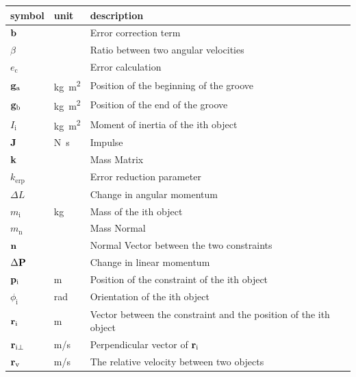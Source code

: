 \documentclass[12pt]{article}
\begin{document}
\noindent \begin{longtable}{l l p{12cm}} \toprule
  \textbf{symbol} & \textbf{unit} & \textbf{description}\\
  \midrule 
  $\bf b$ & \si[per-mode=symbol]    & Error correction term
  \\ 
  $\beta$ & \si[per-mode=symbol]    & Ratio between two angular velocities
  \\ 
  $e_\text{c}$ & \si[per-mode=symbol]   & Error calculation
  \\ 
$\bf{g_\text{a}}$ & \si[per-mode=symbol] {\kilo\gram\metre^{2}} & Position of
the beginning of the groove
  \\ 
$\bf{g_\text{b}}$ & \si[per-mode=symbol] {\kilo\gram\metre^{2}} & Position of
the end of the groove
  \\ 
$ I_\text{i}$ & \si[per-mode=symbol] {\kilo\gram\metre^{2}} & Moment of inertia
of the ith object
  \\ 
  $\bf{J}$ & \si[per-mode=symbol] {\newton\second}   & Impulse
  \\  
  $\bf{k}$ & \si[per-mode=symbol]    & Mass Matrix
  \\  
  $k_\text{erp}$ & \si[per-mode=symbol]    & Error reduction parameter
  \\  
  $\Delta L$ & \si[per-mode=symbol]   & Change in angular momentum
  \\ 
  $m_\text{i}$ & \si[per-mode=symbol] {\kilo\gram}   & Mass of the ith object
  \\ 
  $m_\text{n}$ & \si[per-mode=symbol]  & Mass Normal
  \\ 
  $\bf n$ & \si[per-mode=symbol]    & Normal Vector between the two constraints
  \\ 
  $\Delta \bf{P}$ & \si[per-mode=symbol]   & Change in linear momentum
  \\ 
$\bf{p}_\text{i}$ & \si[per-mode=symbol] {\metre} & Position of the constraint
of the ith object
  \\ 
$\phi_\text{i}$ & \si[per-mode=symbol] {\radian} & Orientation of the ith object
  \\ 
$\textbf r_\text{i}$ & \si[per-mode=symbol] {\metre} &Vector between the
constraint and the position of the ith object
  \\ 
$\textbf r_\text{i$\perp$}$ & \si[per-mode=symbol] {\metre\per\second}
&Perpendicular vector of $\textbf r_\text{i}$
  \\ 
$\textbf r_\text{v}$ & \si[per-mode=symbol] {\metre\per\second} &The relative
velocity between two objects
  \\ 

\end{longtable}
\end{document}
